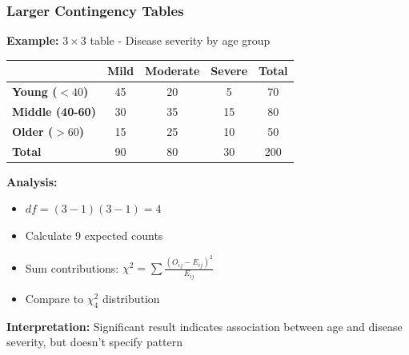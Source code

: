 \documentclass{beamer}
\begin{document}
\begin{frame}
\frametitle{Larger Contingency Tables}
\textbf{Example:} $3 \times 3$ table - Disease severity by age group

\vspace{0.3cm}
\begin{center}
\begin{tabular}{l|ccc|c}
& \textbf{Mild} & \textbf{Moderate} & \textbf{Severe} & \textbf{Total} \\
\hline
\textbf{Young ($<40$)} & 45 & 20 & 5 & 70 \\
\textbf{Middle (40-60)} & 30 & 35 & 15 & 80 \\
\textbf{Older ($>60$)} & 15 & 25 & 10 & 50 \\
\hline
\textbf{Total} & 90 & 80 & 30 & 200 \\
\end{tabular}
\end{center}

\vspace{0.5cm}
\textbf{Analysis:}
\begin{itemize}
\item $df = (3-1)(3-1) = 4$
\item Calculate 9 expected counts
\item Sum contributions: $\chi^2 = \sum \frac{(O_{ij}-E_{ij})^2}{E_{ij}}$
\item Compare to $\chi^2_4$ distribution
\end{itemize}

\vspace{0.3cm}
\textbf{Interpretation:} Significant result indicates association between age and disease severity, but doesn't specify pattern
\end{frame}
\end{document}
